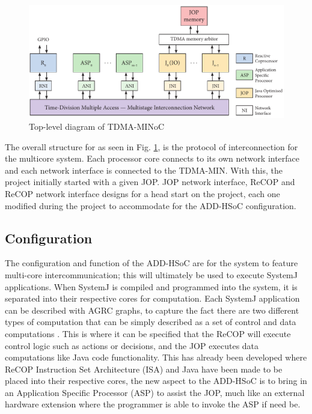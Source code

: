 \documentclass[]{article}
\begin{document}
	\begin{figure}[H]
		\centering
		\includegraphics[width = 5.5in]{noc_block_diagram}
		\caption{Top-level diagram of TDMA-MINoC}
		\label{fig:noc_block}
	\end{figure}
	
	
	The overall structure for as seen in Fig. \ref{fig:noc_block}, is the protocol of interconnection for the multicore system. Each processor core connects to its own network interface and each network interface is connected to the TDMA-MIN. With this, the project initially started with a given JOP. JOP network interface, ReCOP and ReCOP network interface designs for a head start on the project, each one modified during the project to accommodate for the ADD-HSoC configuration.
	
	\subsection{Configuration}
	
	The configuration and function of the ADD-HSoC are for the system to feature multi-core intercommunication; this will ultimately be used to execute SystemJ applications. When SystemJ is compiled and programmed into the system, it is separated into their respective cores for computation. Each SystemJ application can be described with AGRC graphs, to capture the fact there are two different types of computation that can be simply described as a set of control and data computations \cite{Malik2008}. This is where it can be specified that the ReCOP will execute control logic such as actions or decisions, and the JOP executes data computations like Java code functionality. This has already been developed where ReCOP Instruction Set Architecture (ISA) and Java have been made to be placed into their respective cores, the new aspect to the ADD-HSoC is to bring in an Application Specific Processor (ASP) to assist the JOP, much like an external hardware extension where the programmer is able to invoke the ASP if need be. \par 
	
\end{document}
